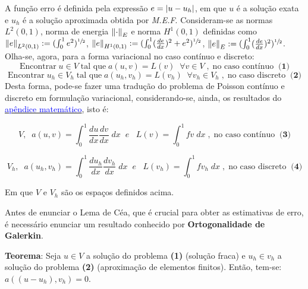 \documentclass{article}
\theoremstyle{definition}
\theoremstyle{plain}
\numberwithin{equation}{section}
\newcommand{\tab}{\hspace{10mm}}
\begin{document}
\tab A função erro é definida pela expressão $e = \abs{u - u_h}$, em que $u$ é a solução exata e $u_h$ é a solução aproximada obtida por \emph{M.E.F}. Consideram-se as normas $L^2(0,1)$, norma de energia $\norm{\cdot}_E$ e norma $H^1(0,1)$ definidas como $\norm{e}_{L^2(0,1)}:=(\int_0^1 e^2)^{\sfrac{1}{2}} $, $\norm{e}_{H^1(0,1)}:=(\int_0^1 (\frac{de}{dx})^2 + e^2)^{\sfrac{1}{2}}$, $\norm{e}_{E}:=(\int_0^1 (\frac{de}{dx})^2)^{\sfrac{1}{2}}$. Olha-se, agora, para a forma variacional no caso contínuo e discreto:
\begin{equation*}
    \textrm{Encontrar} \; u \in V \; \textrm{tal que} \; a(u,v)=L(v) \; \; \forall v \in V \;, \; \textrm{no caso contínuo} \; \; \textbf{(1)}
\end{equation*}
\begin{equation*}
    \textrm{Encontrar} \; u_h \in V_h \; \textrm{tal que} \; a(u_h,v_h)=L(v_h) \; \; \forall v_h \in V_h \;, \; \textrm{no caso discreto} \; \; \textbf{(2)}
\end{equation*}
 Desta forma, pode-se fazer uma tradução do problema de Poisson contínuo e discreto em formulação variacional, considerando-se, ainda, os resultados do \hyperref[sec:7.3]{\textcolor{blue}{apêndice matemático}}, isto é:

\begin{equation*}
    V, \; \; a(u,v)=\int^1_0\frac{du}{dx}\frac{dv}{dx} \; dx \; \; e \; \; \;L(v)=\int^1_0 fv \; dx \;, \; \textrm{no caso contínuo} \; \; \textbf{(3)}
\end{equation*}

\begin{equation*}
    V_h, \; \;
    a(u_h,v_h)=\int^1_0\frac{du_h}{dx}\frac{dv_h}{dx} \; dx \; \; e \; \; \;L(v_h)=\int^1_0 fv_h \; dx \;, \; \textrm{no caso discreto} \; \; \textbf{(4)}
\end{equation*}

\vspace{1mm}

Em que $V$ e $V_h$ são os espaços definidos acima.
 
 \vspace{5mm}
 
 Antes de enunciar o Lema de Céa, que é crucial para obter as estimativas de erro, é necessário enunciar um resultado conhecido por \textbf{Ortogonalidade de Galerkin}.
 
 \vspace{1mm}
 
 \textbf{Teorema}: Seja  $u \in V$ a solução do problema \textbf{(1)} (solução fraca) e $u_h \in v_h$ a solução do problema \textbf{(2)} (aproximação de elementos finitos). Então, tem-se: $a((u-u_h),v_h)=0$.
\end{document}
